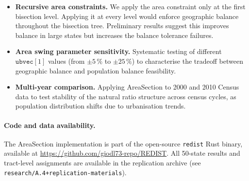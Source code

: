 \begin{itemize}
\item \textbf{Recursive area constraints.} We apply the area constraint only
  at the first bisection level. Applying it at every level would enforce
  geographic balance throughout the bisection tree.
  Preliminary results suggest this improves balance in large states but
  increases the balance tolerance failures.

\item \textbf{Area swing parameter sensitivity.} Systematic testing of
  different $\mathtt{ubvec}[1]$ values (from $\pm 5\,\%$ to $\pm 25\,\%$)
  to characterise the tradeoff between geographic balance and population
  balance feasibility.

\item \textbf{Multi-year comparison.} Applying AreaSection to 2000 and 2010
  Census data to test stability of the natural ratio structure across
  census cycles, as population distribution shifts due to urbanisation trends.
\end{itemize}

\paragraph{Code and data availability.}
The AreaSection implementation is part of the open-source \texttt{redist}
Rust binary, available at \url{https://github.com/giodl73-repo/REDIST}.
All 50-state results and tract-level assignments are available in the
replication archive (see \texttt{research/A.4+replication-materials}).
